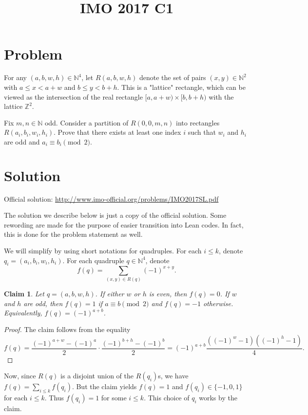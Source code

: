 \documentclass{article}
\title{IMO 2017 C1}
\author{}
\date{}
\newcommand{\N}{\mathbb{N}}
\newcommand{\Z}{\mathbb{Z}}
\newtheorem*{claim}{Claim}
\begin{document}
\maketitle



\section*{Problem}

For any $(a, b, w, h) \in \N^4$, let $R(a, b, w, h)$ denote the set of pairs $(x, y) \in \N^2$ with $a \leq x < a + w$ and $b \leq y < b + h$.
This is a "lattice" rectangle, which can be viewed as the intersection of the real rectangle $[a, a + w) \times [b, b + h)$ with the lattice $\Z^2$.

Fix $m, n \in \N$ odd.
Consider a partition of $R(0, 0, m, n)$ into rectangles $R(a_i, b_i, w_i, h_i)$.
Prove that there exists at least one index $i$ such that $w_i$ and $h_i$ are odd and $a_i \equiv b_i \pmod{2}$.



\section*{Solution}

Official solution: \url{http://www.imo-official.org/problems/IMO2017SL.pdf}

The solution we describe below is just a copy of the official solution.
Some rewording are made for the purpose of easier transition into Lean codes.
In fact, this is done for the problem statement as well.

We will simplify by using short notations for quadruples.
For each $i \leq k$, denote $q_i = (a_i, b_i, w_i, h_i)$.
For each quadruple $q \in \N^4$, denote
\[ f(q) = \sum_{(x, y) \in R(q)} (-1)^{x + y}. \]

\begin{claim}
Let $q = (a, b, w, h)$.
If either $w$ or $h$ is even, then $f(q) = 0$.
If $w$ and $h$ are odd, then $f(q) = 1$ if $a \equiv b \pmod{2}$ and $f(q) = -1$ otherwise.
Equivalently, $f(q) = (-1)^{a + b}$.
\end{claim}
\begin{proof}
The claim follows from the equality
\[ f(q) = \frac{(-1)^{a + w} - (-1)^a}{2} \cdot \frac{(-1)^{b + h} - (-1)^b}{2} = (-1)^{a + b}\frac{((-1)^w - 1)((-1)^h - 1)}{4}. \]
\end{proof}

Now, since $R(q)$ is a disjoint union of the $R(q_i)$s, we have $f(q) = \sum_{i \leq k} f(q_i)$.
But the claim yields $f(q) = 1$ and $f(q_i) \in \{-1, 0, 1\}$ for each $i \leq k$.
Thus $f(q_i) = 1$ for some $i \leq k$.
This choice of $q_i$ works by the claim.
\end{document}
